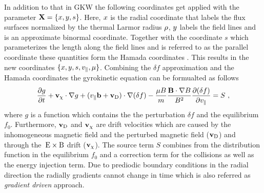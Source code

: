 In addition to that in GKW the following coordinates get applied with the parameter $\boldsymbol{\mathbf{X}} = \{x, y, s\}$. Here, $x$ is the radial coordinate that labels the flux surfaces normalized by the thermal Larmor radius $\rho$, $y$ labels the field lines and is an approximate binormal coordinate. Together with the coordinate $s$ which parameterizes the length along the field lines and is referred to as the parallel coordinate these quantities form the Hamada coordinates \cite{Hamada1958}. This results in the new coordinates $\{x, y, s, v_\parallel, \mu\}$. Combining the $\delta f$ approximation and the Hamada coordinates the gyrokinetic equation can be formualted as follows
\begin{gather}
	\frac{\partial g}{\partial t} + \boldsymbol{\mathbf{v}}_\chi \cdot \nabla g + (v_\parallel \boldsymbol{\mathbf{b}} + \boldsymbol{\mathbf{v}}_\mathrm{D}) \cdot \nabla(\delta f) - \frac{\mu B}{m}\frac{\boldsymbol{\mathbf{B}}\cdot\nabla B}{B^2}\frac{\partial (\delta f)}{\partial v_\parallel} = S~,
\end{gather}
where $g$ is a function which contains the the perturbation $\delta f$ and the equilibrium $f_0$. Furthermore, $\boldsymbol{\mathbf{v}}_\mathrm{D}$ and $\boldsymbol{\mathbf{v}}_\chi$ are drift velocities which are caused by the inhomogeneous magnetic field and the perturbed magnetic field ($\boldsymbol{\mathbf{v}}_\mathrm{D}$) and through the $\mathrm{\:E}\times\mathrm{B}$ drift ($\boldsymbol{\mathbf{v}}_\chi$). The source term $S$ combines from the distribution function in the equilibrium $f_0$ and a correction term for the collisions as well as the energy injection term. Due to prediodic boundary conditions in the radial direction the radially gradients cannot change in time which is also referred as \textit{gradient driven} approach. \cite{Peeters2009}